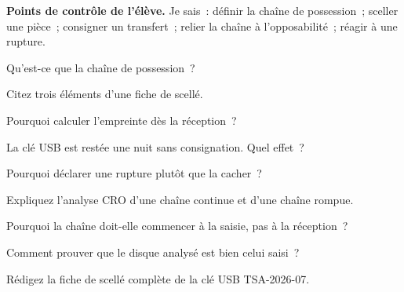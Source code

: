 \begin{boxinfo}
\textbf{Points de contrôle de l'élève.} Je sais~: définir la chaîne de
possession~; sceller une pièce~; consigner un transfert~; relier la chaîne à
l'opposabilité~; réagir à une rupture.
\end{boxinfo}

\bigskip

\begin{boxexo}[title={\ding{45}\quad Exercice~5.1. Définir \niveaubase}]
Qu'est-ce que la chaîne de possession~?
\end{boxexo}

\begin{boxexo}[title={\ding{45}\quad Exercice~5.2. Sceller \niveaubase}]
Citez trois éléments d'une fiche de scellé.
\end{boxexo}

\begin{boxexo}[title={\ding{45}\quad Exercice~5.3. L'empreinte \niveaubase}]
Pourquoi calculer l'empreinte dès la réception~?
\end{boxexo}

\begin{boxexo}[title={\ding{45}\quad Exercice~5.4. Le trou \niveaumoyen}]
La clé USB est restée une nuit sans consignation. Quel effet~?
\end{boxexo}

\begin{boxexo}[title={\ding{45}\quad Exercice~5.5. Déclarer \niveaumoyen}]
Pourquoi déclarer une rupture plutôt que la cacher~?
\end{boxexo}

\begin{boxexo}[title={\ding{45}\quad Exercice~5.6. CRO \niveaumoyen}]
Expliquez l'analyse CRO d'une chaîne continue et d'une chaîne rompue.
\end{boxexo}

\begin{boxexo}[title={\ding{45}\quad Exercice~5.7. Terrain \niveaumoyen}]
Pourquoi la chaîne doit-elle commencer à la saisie, pas à la réception~?
\end{boxexo}

\begin{boxexo}[title={\ding{45}\quad Exercice~5.8. Identité de la pièce \niveaumoyen}]
Comment prouver que le disque analysé est bien celui saisi~?
\end{boxexo}

\begin{boxexo}[title={\ding{45}\quad Exercice~5.9. Fiche de scellé \niveauexpert}]
Rédigez la fiche de scellé complète de la clé USB TSA-2026-07.
\end{boxexo}

